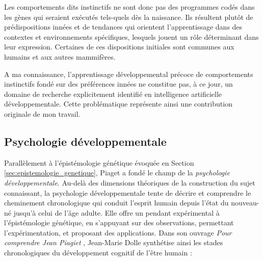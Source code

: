 Les comportements dits instinctifs ne sont donc pas des programmes codés dans les gènes qui seraient exécutés tels-quels dès la naissance. 
Ils résultent plutôt de prédispositions innées et de tendances qui orientent l'apprentissage dans des contextes et environnements spécifiques, lesquels jouent un rôle déterminant dans leur expression. 
Certaines de ces dispositions initiales sont communes aux humains et aux autres mammifères. 


A ma connaissance, l’apprentissage développemental précoce de comportements instinctifs fondé sur des préférences innées ne constitue pas, à ce jour, un domaine de recherche explicitement identifié en intelligence artificielle développementale. 
Cette problématique représente ainsi une contribution originale de mon travail.

\subsection{Psychologie développementale}

\noindent
Parallèlement à l'épistémologie génétique évoquée en Section \ref{sec:epistemologie_genetique}, Piaget a fondé le champ de la \emph{psychologie développementale}. 
Au-delà des dimensions théoriques de la construction du sujet connaissant, la psychologie développementale tente de décrire et comprendre le cheminement chronologique qui conduit l'esprit humain depuis l'état du nouveau-né jusqu'à celui de l'âge adulte.
Elle offre un pendant expérimental à l'épistémologie génétique, en s'appuyant sur des observations, permettant l'expérimentation, et proposant des applications. 
Dans son ouvrage \emph{Pour comprendre Jean Piagiet} \cite{dolle_pour_1997}, Jean-Marie Dolle synthétise ainsi les stades chronologiques du développement cognitif de l'être humain :

